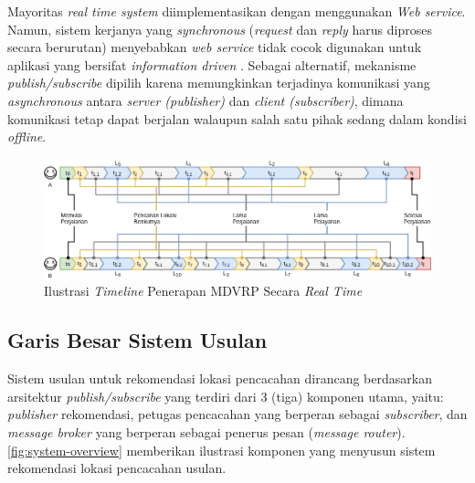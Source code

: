 Mayoritas \textit{real time system} diimplementasikan dengan menggunakan \textit{Web service}. Namun, sistem kerjanya yang \textit{synchronous} (\textit{request} dan \textit{reply} harus diproses secara berurutan) menyebabkan \textit{web service} tidak cocok digunakan untuk aplikasi yang bersifat \textit{information driven} \citep{muhl_large-scale_2002}. Sebagai alternatif, mekanisme \textit{publish/subscribe} dipilih karena memungkinkan terjadinya komunikasi yang \textit{asynchronous} antara \textit{server (publisher)} dan \textit{client (subscriber)}, dimana komunikasi tetap dapat berjalan walaupun salah satu pihak sedang dalam kondisi \textit{offline}.


\begin{figure}[!]
	\centering
	\includegraphics[width=\textwidth]{Resources/Images/illustration-timeline-realtime-mdvrp}
	\captionsetup{format=hang}
	\caption{Ilustrasi \textit{Timeline} Penerapan MDVRP Secara \textit{Real Time}}
	\label{fig:illustration-timeline-realtime-mdvrp}
\end{figure}

\subsection{Garis Besar Sistem Usulan}
Sistem usulan untuk rekomendasi lokasi pencacahan dirancang berdasarkan arsitektur \textit{publish/subscribe} yang terdiri dari 3 (tiga) komponen utama, yaitu: \textit{publisher} rekomendasi, petugas pencacahan yang berperan sebagai \textit{subscriber}, dan \textit{message broker} yang berperan sebagai penerus pesan (\textit{message router}). \autoref{fig:system-overview} memberikan ilustrasi komponen yang menyusun sistem rekomendasi lokasi pencacahan usulan.


